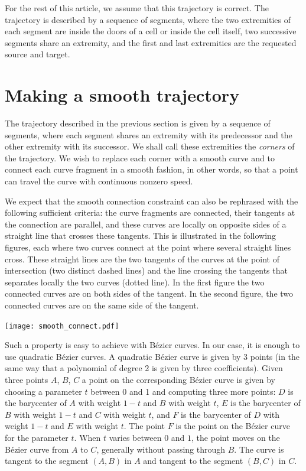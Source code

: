 \documentclass{easychair}
\begin{document}
For the rest of this article, we assume that this trajectory is
correct.  The trajectory is described by a sequence of segments, where
the two extremities of each segment are inside the doors of a cell or
inside the cell itself, two successive segments share an extremity,
and the first and last extremities are the requested source and target.

\section{Making a smooth trajectory}
The trajectory described in the previous section is given by a
sequence of segments, where each segment shares an extremity with its
predecessor and the other extremity with its successor.  We shall call
these extremities the {\em corners} of the trajectory.  We wish to
replace each corner with a smooth curve and to connect each curve fragment in
a smooth fashion, in other words, so that a point can travel the curve with
continuous nonzero speed.

We expect that the smooth connection constraint can also be rephrased
with the following sufficient criteria: the curve fragments are connected,
their tangents at the connection are parallel, and these curves are
locally on opposite sides of a straight line that crosses these
tangents.  This is illustrated in the following figures, each where
two curves connect at the point where several straight lines cross.
These straight lines are the two tangents of the curves at the point of
intersection (two distinct dashed lines) and the line crossing the
tangents that separates locally the two curves (dotted line).  In the
first figure the two connected curves are on both sides of the tangent.
In the second figure, the two connected curves are on the same side of the
tangent.

\begin{center}
\texttt{[image: smooth\_connect.pdf]}
\end{center}

Such a property is easy to achieve with Bézier curves.  In our case,
it is enough to use quadratic Bézier curves.  A quadratic Bézier curve
is given by 3 points (in the same way that a polynomial of degree 2 is
given by three coefficients).  Given three points \(A\), \(B\), \(C\)
a point on the corresponding Bézier curve is given by choosing a
parameter \(t\) between 0 and 1 and computing three more points:
\(D\) is the barycenter of \(A\) with weight \(1 - t\) and \(B\) with
weight \(t\), \(E\) is the barycenter of \(B\) with weight \(1 - t\)
and \(C\) with weight \(t\), and \(F\) is the barycenter of \(D\) with
weight \(1-t\) and \(E\) with weight \(t\).  The point \(F\) is the
point on the Bézier curve for the parameter \(t\).  When \(t\) varies
between \(0\) and \(1\), the point moves on the Bézier curve from \(A\)
to \(C\), generally without passing through \(B\).  The curve
is tangent to the segment \((A,B)\) in \(A\) and tangent to
the segment \((B,C)\) in \(C\).
\end{document}
